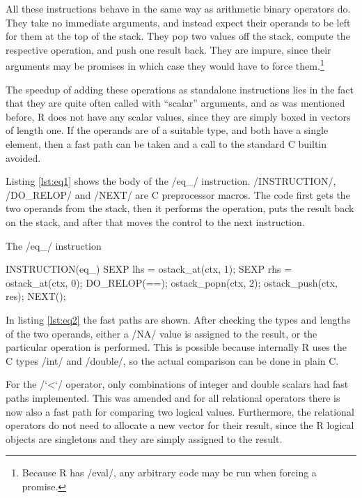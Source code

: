 All these instructions behave in the same way as arithmetic binary operators do. They take no immediate arguments, and instead expect their operands to be left for them at the top of the stack. They pop two values off the stack, compute the respective operation, and push one result back. They are impure, since their arguments may be promises in which case they would have to force them.\footnote{Because R has \rinline/eval/, any arbitrary code may be run when forcing a promise.}

The speedup of adding these operations as standalone instructions lies in the fact that they are quite often called with ``scalar'' arguments, and as was mentioned before, R does not have any scalar values, since they are simply boxed in vectors of length one. If the operands are of a suitable type, and both have a single element, then a fast path can be taken and a call to the standard C builtin avoided.

Listing \ref{lst:eq1} shows the body of the \cinline/eq_/ instruction. \cinline/INSTRUCTION/, \cinline/DO_RELOP/ and \cinline/NEXT/ are C preprocessor macros. The code first gets the two operands from the stack, then it performs the operation, puts the result back on the stack, and after that moves the control to the next instruction.

\begin{listing}[htbp]
  \caption{\label{lst:eq1}The \cinline/eq_/ instruction}
  \begin{ccode}
INSTRUCTION(eq_) {
    SEXP lhs = ostack_at(ctx, 1);
    SEXP rhs = ostack_at(ctx, 0);
    DO_RELOP(==);
    ostack_popn(ctx, 2);
    ostack_push(ctx, res);
    NEXT();
}
  \end{ccode}
\end{listing}

In listing \ref{lst:eq2} the fast paths are shown. After checking the types and lengths of the two operands, either a \rinline/NA/ value is assigned to the result, or the particular operation is performed. This is possible because internally R uses the C types \cinline/int/ and \cinline/double/, so the actual comparison can be done in plain C.

For the \rinline/`<`/ operator, only combinations of integer and double scalars had fast paths implemented. This was amended and for all relational operators there is now also a fast path for comparing two logical values. Furthermore, the relational operators do not need to allocate a new vector for their result, since the R logical objects are singletons and they are simply assigned to the result.

